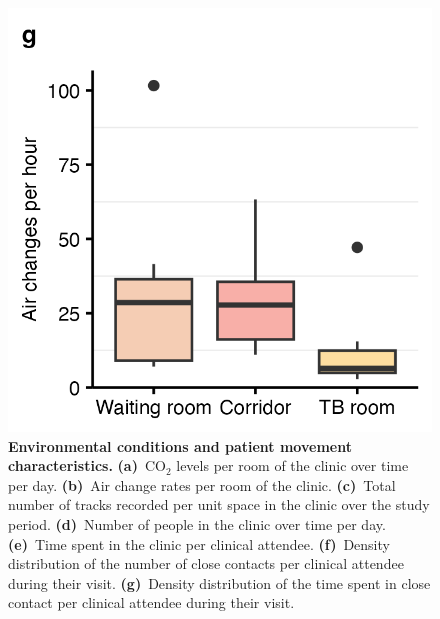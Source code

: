 \documentclass[fleqn,11pt]{wlscirep}
\begin{document}
\begin{figure}
    \includegraphics{results/data/air-changes-per-hour.png}
    \caption{\textbf{Environmental conditions and patient movement characteristics.} \textbf{(a)}~CO$_2$ levels per room of the clinic over time per day. \textbf{(b)}~Air change rates per room of the clinic. \textbf{(c)}~Total number of tracks recorded per unit space in the clinic over the study period. \textbf{(d)}~Number of people in the clinic over time per day. \textbf{(e)}~Time spent in the clinic per clinical attendee. \textbf{(f)}~Density distribution of the number of close contacts per clinical attendee during their visit. \textbf{(g)}~Density distribution of the time spent in close contact per clinical attendee during their visit.}
    \label{fig:input-data-descriptives}
\end{figure}
\end{document}
